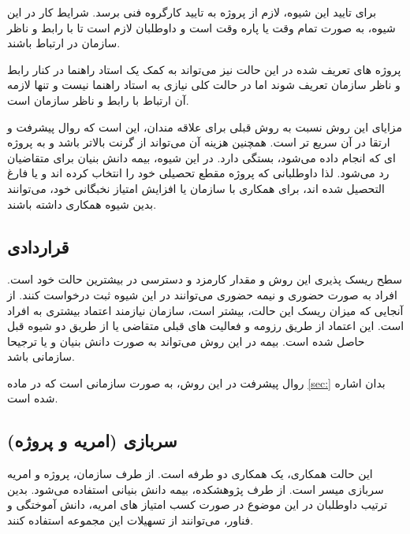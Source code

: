 برای تایید این شیوه، لازم از پروژه به تایید کارگروه فنی برسد. شرایط کار در این شیوه، به صورت تمام وقت یا  پاره وقت است و داوطلبان لازم است تا با رابط و ناظر سازمان در ارتباط باشند. 

\begin{note}
	پروژه های تعریف شده در این حالت نیز می‌تواند به کمک یک استاد راهنما در کنار رابط و ناظر سازمان تعریف شوند اما در حالت کلی نیازی به استاد راهنما نیست و تنها لازمه آن ارتباط با رابط و ناظر سازمان است.
\end{note}

مزایای این روش نسبت به روش قبلی برای علاقه مندان، این است که روال پیشرفت و ارتقا در آن سریع تر است. همچنین هزینه آن می‌تواند از گرنت بالاتر باشد و به پروژه ای که انجام داده می‌شود، بستگی دارد. در این شیوه، بیمه دانش بنیان برای متقاضیان رد می‌شود. لذا داوطلبانی که پروژه مقطع تحصیلی خود را انتخاب کرده اند و یا فارغ التحصیل شده اند، برای همکاری با سازمان یا افزایش امتیاز نخبگانی خود، می‌توانند بدین شیوه همکاری داشته باشند.


\subsection{قراردادی}

سطح ریسک پذیری این روش و مقدار کارمزد و دسترسی در بیشترین حالت خود است. افراد به صورت حضوری و نیمه حضوری می‌توانند در این شیوه ثبت درخواست کنند.  از آنجایی که میزان ریسک این حالت، بیشتر است، سازمان نیازمند اعتماد بیشتری به افراد است. این اعتماد از طریق رزومه و فعالیت های قبلی متقاضی یا از طریق دو شیوه قبل حاصل شده است. بیمه در این روش می‌تواند به صورت دانش بنیان و یا ترجیحا سازمانی باشد.
 
 \begin{note}
 	روال پیشرفت در این روش، به صورت سازمانی است که در ماده 
 	\ref{sec:}
 	بدان اشاره شده است.
 \end{note}
 
 
\subsection{سربازی (امریه و پروژه)}

این حالت همکاری، یک همکاری دو طرفه است. از طرف سازمان، پروژه و امریه سربازی میسر است. از طرف پژوهشکده، بیمه دانش بنیانی استفاده می‌شود. بدین ترتیب داوطلبان در این موضوع در صورت کسب امتیاز های امریه، دانش آموختگی و فناور، می‌توانند از تسهیلات این مجموعه استفاده کنند.







